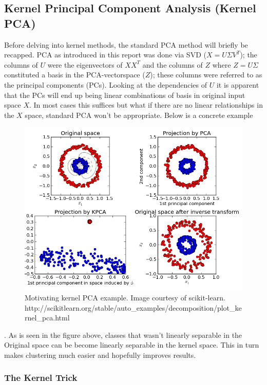 \subsection{Kernel Principal Component Analysis (Kernel PCA)}

Before delving into kernel methods, the standard PCA method will briefly be recapped.
 PCA as introduced in this report was done via SVD ($X=U\Sigma V^T$); the columns of $U$ were the eigenvectors of $XX^T$ and the columns of $Z$ where $Z=U\Sigma$ constituted a basis in the PCA-vectorspace ($Z$); these columns were referred to as the principal components (PCs). 
Looking at the dependencies of $U$ it is apparent that the PCs will end up being linear combinations of basis in original input space $X$. 
In most cases this suffices but what if there are no linear relationships in the $X$ space, standard PCA won't be appropriate.
Below is a concrete example

\begin{figure}[H]
	\center
	\includegraphics[width=\textwidth]{figures/kernel_pca_example.png}
	\caption{Motivating kernel PCA example. Image courtesy of scikit-learn. http://scikitlearn.org/stable/auto\_examples/decomposition/plot\_kernel\_pca.html }
	\label{fig:motivation_kernelpca}
\end{figure}.
As is seen in the figure above, classes that wasn't linearly separable in the Original space can be become linearly separable in the kernel space. This in turn makes clustering much easier and hopefully improves results.

\subsubsection{The Kernel Trick}

